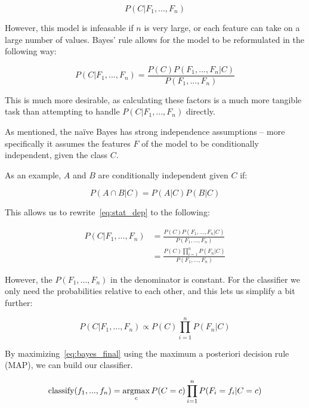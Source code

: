 \begin{equation}
  P(C|F_1,...,F_n)
\end{equation}

However, this model is infeasable if $n$ is very large, or each feature can take on a large number of values. Bayes' rule allows for the model to be reformulated in the following way:

\begin{equation}
  P(C|F_1,...,F_n) = \frac{P(C) P(F_1,...,F_n|C)}{P(F_1,...,F_n)}
  \label{eq:stat_dep}
\end{equation}

This is much more desirable, as calculating these factors is a much more tangible task than attempting to handle $P(C|F_1,...,F_n)$ directly.

As mentioned, the naïve Bayes has strong independence assumptions -- more specifically it assumes the features $F$ of the model to be conditionally independent, given the class $C$.

As an example, $A$ and $B$ are conditionally independent given $C$ if:

\begin{equation}
  P(A \cap B | C) = P(A|C) P(B|C)
\end{equation}

This allows us to rewrite~\eqref{eq:stat_dep} to the following:

\begin{align}
  P(C|F_1,...,F_n) &= \frac{P(C) P(F_1,...,F_n|C)}{P(F_1,...,F_n)} \\
                   &= \frac{P(C) \prod_{i=1}^n P(F_n|C)}{P(F_1,...,F_n)}
\end{align}

However, the $P(F_1,...,F_n)$ in the denominator is constant. For the classifier we only need the probabilities relative to each other, and this lets us simplify a bit further:

\begin{equation}
  P(C|F_1,...,F_n) \propto P(C) \prod_{i=1}^n P(F_n|C)
  \label{eq:bayes_final}
\end{equation}

By maximizing~\eqref{eq:bayes_final} using the maximum a posteriori decision rule (MAP), we can build our classifier.

\begin{equation}
  \text{classify}(f_1, ..., f_n) = \argmax_c P(C = c) \prod_{i=1}^n P(F_i = f_i| C = c)
\end{equation}

